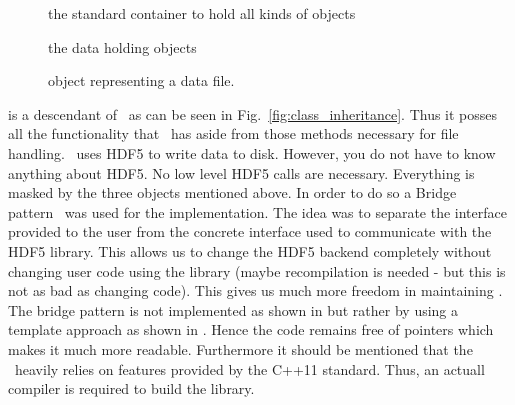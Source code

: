 \begin{description}
\item[\nxgroup] the standard container to hold all kinds of objects
\item[\nxfield] the data holding objects
\item[\nxfile] object representing a data file.
\end{description}
\nxfile is a descendant of \nxgroup\ as can be seen in
Fig.~\ref{fig:class_inheritance}. Thus it posses all the functionality that 
\nxgroup\ has aside from those methods necessary for file handling. 
\pninx\ uses HDF5 to write data to disk. However, you do not have to know 
anything about HDF5. No low level HDF5 calls are necessary. Everything is 
masked by the three objects mentioned above. 
In order to do so a Bridge pattern~\cite{book:gof} was used for the
implementation. The idea was to separate the interface provided to the user from the 
concrete interface used to communicate with the HDF5 library. 
This allows us to change the HDF5 backend completely without changing 
user code using the library (maybe recompilation is needed - but this is not as
bad as changing code). This gives us much more freedom in maintaining \pninx.
The bridge pattern is not implemented as shown in \cite{book:gof} but rather 
by using a template approach as shown  in \cite{book:alexandrescu}.
Hence the code remains free of pointers which makes it much more readable. 
Furthermore it should be mentioned that the \pninx\ heavily relies on features 
provided by the C++11 standard. Thus, an actuall compiler is required to 
build the library.
 

